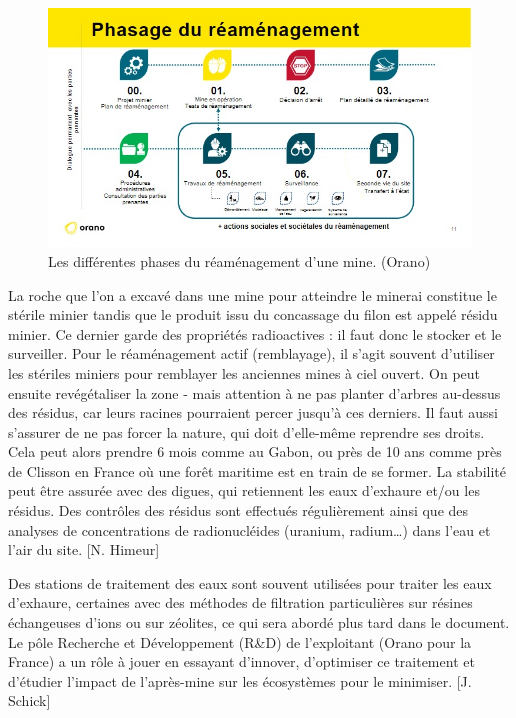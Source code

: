 \documentclass{article}
\begin{document}
\begin{figure}[!h]
    \centering
    \includegraphics[width=\linewidth]{I_B_1.jpg}
    \caption{Les différentes phases du réaménagement d'une mine. (Orano)}
    \label{fig:phases_reamenagement}
\end{figure}

La roche que l’on a excavé dans une mine pour atteindre le minerai constitue le stérile minier tandis que le produit issu du concassage du filon est appelé résidu minier. Ce dernier garde des propriétés radioactives : il faut donc le stocker et le surveiller.
Pour le réaménagement actif (remblayage), il s’agit souvent d’utiliser les stériles miniers pour remblayer les anciennes mines à ciel ouvert. On peut ensuite revégétaliser la zone - mais attention à ne pas planter d’arbres au-dessus des résidus, car leurs racines pourraient percer jusqu’à ces derniers. Il faut aussi s’assurer de ne pas forcer la nature, qui doit d’elle-même reprendre ses droits. Cela peut alors prendre 6 mois comme au Gabon, ou près de 10 ans comme près de Clisson en France où une forêt maritime est en train de se former. La stabilité peut être assurée avec des digues, qui retiennent les eaux d’exhaure et/ou les résidus. Des contrôles des résidus sont effectués régulièrement ainsi que des analyses de concentrations de radionucléides (uranium, radium…) dans l’eau et l’air du site.  [N. Himeur]

Des stations de traitement des eaux sont souvent utilisées pour traiter les eaux d’exhaure, certaines avec des méthodes de filtration particulières sur résines échangeuses d’ions ou sur zéolites, ce qui sera abordé plus tard dans le document. Le pôle Recherche et Développement (R\&D) de l’exploitant (Orano pour la France) a un rôle à jouer en essayant d’innover, d’optimiser ce traitement et d’étudier l’impact de l’après-mine sur les écosystèmes pour le minimiser. [J. Schick]
\end{document}
